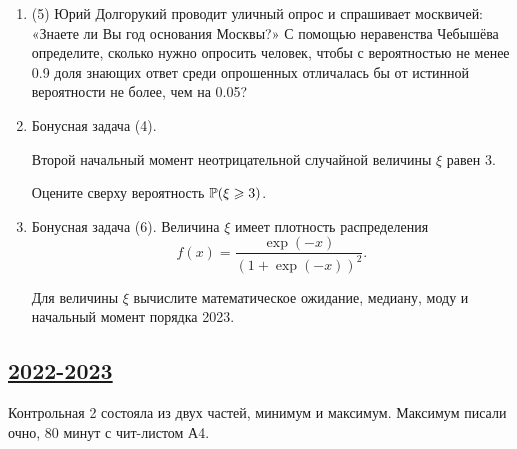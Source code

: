 \begin{enumerate}
	\item (5) Юрий Долгорукий проводит уличный опрос и спрашивает москвичей: «Знаете ли Вы год основания Москвы?» 
	 С помощью неравенства Чебышёва определите, сколько нужно опросить человек, 
	 чтобы с вероятностью не менее 0.9 доля знающих ответ среди опрошенных отличалась бы от истинной вероятности не более, чем на 0.05?
	
	\item Бонусная задача  (4). 
	
	Второй начальный момент неотрицательной случайной величины $\xi$ равен 3. 
	 
	 Оцените сверху вероятность $\P(\xi\geq 3)$.
	
	
	\item Бонусная задача (6). 
	Величина $\xi$ имеет плотность распределения
	\[
	f(x)=\frac{\exp(-x)}{(1+\exp(-x))^2}.
	\]
	
	Для величины $\xi$ вычислите математическое ожидание, медиану, моду и начальный момент порядка 2023.
	
\end{enumerate}


\subsection[2022-2023]{\hyperref[sec:sol_kr_02_ip_2022_2023]{2022-2023}}
\label{sec:kr_02_ip_2022_2023}

Контрольная 2 состояла из двух частей, минимум и максимум.
Максимум писали очно, 80 минут с чит-листом А4. 

